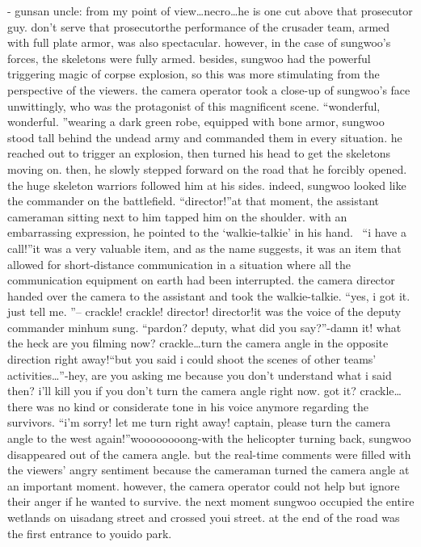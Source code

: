 - gunsan uncle: from my point of view…necro…he is one cut above that prosecutor guy.
 don’t serve that prosecutorthe performance of the crusader team, armed with full plate armor, was also spectacular.
however, in the case of sungwoo’s forces, the skeletons were fully armed.
 besides, sungwoo had the powerful triggering magic of corpse explosion, so this was more stimulating from the perspective of the viewers.
the camera operator took a close-up of sungwoo’s face unwittingly, who was the protagonist of this magnificent scene.
“wonderful, wonderful.
”wearing a dark green robe, equipped with bone armor, sungwoo stood tall behind the undead army and commanded them in every situation.
 he reached out to trigger an explosion, then turned his head to get the skeletons moving on.
then, he slowly stepped forward on the road that he forcibly opened.
 the huge skeleton warriors followed him at his sides.
indeed, sungwoo looked like the commander on the battlefield.
“director!”at that moment, the assistant cameraman sitting next to him tapped him on the shoulder.
with an embarrassing expression, he pointed to the ‘walkie-talkie’ in his hand.
 “i have a call!”it was a very valuable item, and as the name suggests, it was an item that allowed for short-distance communication in a situation where all the communication equipment on earth had been interrupted.
the camera director handed over the camera to the assistant and took the walkie-talkie.
“yes, i got it.
 just tell me.
”– crackle! crackle! director! director!it was the voice of the deputy commander minhum sung.
“pardon? deputy, what did you say?”-damn it! what the heck are you filming now? crackle…turn the camera angle in the opposite direction right away!“but you said i could shoot the scenes of other teams’ activities…”-hey, are you asking me because you don’t understand what i said then? i’ll kill you if you don’t turn the camera angle right now.
 got it? crackle…there was no kind or considerate tone in his voice anymore regarding the survivors.
“i’m sorry! let me turn right away! captain, please turn the camera angle to the west again!”woooooooong-with the helicopter turning back, sungwoo disappeared out of the camera angle.
but the real-time comments were filled with the viewers’ angry sentiment because the cameraman turned the camera angle at an important moment.
however, the camera operator could not help but ignore their anger if he wanted to survive.
the next moment sungwoo occupied the entire wetlands on uisadang street and crossed youi street.
 at the end of the road was the first entrance to youido park.
